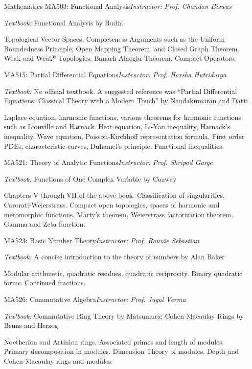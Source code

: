 \begin{rubric}{Mathematics}
    \entry*[AA] MA503: Functional Analysis\hfill\emph{Instructor: Prof. Chandan Biswas}
    
    \emph{Textbook:} Functional Analysis by Rudin

    Topological Vector Spaces, Completeness Arguments such as the Uniform Boundedness Principle, Open Mapping Theorem, and Closed Graph Theorem. Weak and Weak* Topologies, Banach-Alaoglu Theorem. Compact Operators.

    \entry*[AP] MA515: Partial Differential Equations\hfill\emph{Instructor: Prof. Harsha Hutridurga}


    \emph{Textbook:} No official textbook. A suggested reference was ``Partial Differential Equations: Classical Theory with a Modern Touch'' by Nandakumaran and Datti

    Laplace equation, harmonic functions, various theorems for harmonic functions such as Liouville and Harnack. Heat equation, Li-Yau inequality, Harnack's inequality. Wave equation, Poisson-Kirchhoff representation formula. First order PDEs, characteristic curves, Duhamel's principle. Functional inequalities.



    \entry*[AA] MA521: Theory of Analytic Functions\hfill\emph{Instructor: Prof. Shripad Garge}

    \emph{Textbook:} Functions of One Complex Variable by Conway

    Chapters V through VII of the above book. Classification of singularities, Carorati-Weierstrass. Compact open topologies, spaces of harmonic and meromorphic functions. Marty's theorem, Weierstrass factorization theorem. Gamma and Zeta function.

    \entry*[AA] MA523: Basic Number Theory\hfill\emph{Instructor: Prof. Ronnie Sebastian}

    \emph{Textbook:} A concise introduction to the theory of numbers by Alan Baker

    Modular arithmetic, quadratic residues, quadratic reciprocity. Binary quadratic forms. Continued fractions.

    \entry*[AA] MA526: Commutative Algebra\hfill\emph{Instructor: Prof. Jugal Verma}

    \emph{Textbook:} Commutative Ring Theory by Matsumura; Cohen-Macaulay Rings by Bruns and Herzog

    Noetherian and Artinian rings. Associated primes and length of modules. Primary decomposition in modules. Dimension Theory of modules. Depth and Cohen-Macaulay rings and modules.


\end{rubric}
